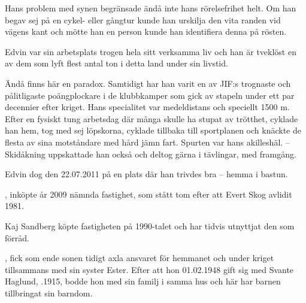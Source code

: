 Hans problem med synen begränsade ändå inte hans rörelsefrihet helt. Om han begav sej på en cykel- eller gångtur kunde han urskilja den vita randen vid vägens kant och mötte han en person kunde han identifiera denna på rösten.

Edvin var sin arbetsplats trogen hela sitt verksamma liv och han är tveklöst en av dem som lyft flest antal ton i detta land under sin livstid.

Ändå finns här en paradox. Samtidigt har han varit en av JIF:s trognaste och pålitligaste poängplockare i de klubbkamper som gick av stapeln under ett par decennier efter kriget. Hans specialitet var medeldistans och speciellt 1500 m. Efter en fysiskt tung arbetsdag där många skulle ha stupat av trötthet, cyklade han hem, tog med sej löpskorna, cyklade tillbaka till sportplanen och knäckte de flesta av sina motståndare med  hård jämn fart. Spurten var hans akilleshäl. -- Skidåkning uppskattade han också och deltog gärna i tävlingar, med framgång.

Edvin dog den 22.07.2011 på en plats där han trivdes bra – hemma i bastun.


%

%
, inköpte år 2009 nämnda fastighet, som stått tom efter att Evert Skog avlidit 1981.\jhvspace{}


%
Kaj Sandberg köpte fastigheten på 1990-talet och har tidvis utnyttjat den som förråd.\jhvspace{}



%
, fick som ende sonen tidigt axla ansvaret för hemmanet och under kriget tillsammans med sin syster Ester. Efter att hon 01.02.1948 gift sig med Svante Haglund, .1915, bodde hon med sin familj i samma hus och här har barnen tillbringat sin barndom.
\begin{jhchildren}
  \item {}
  \item {}
  \item {}
  \item {}
  \item {}
\end{jhchildren}

